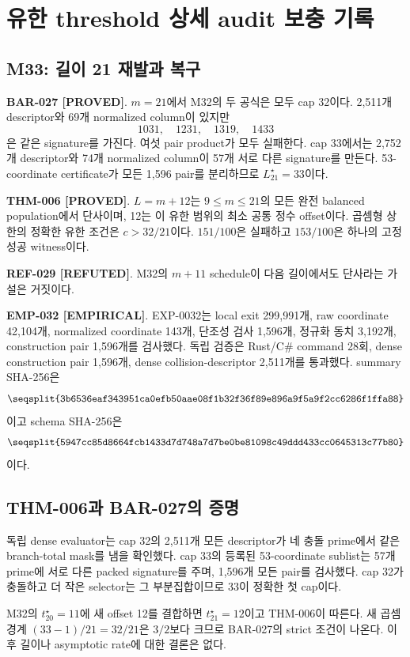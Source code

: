 \documentclass[11pt]{article}
\newcommand{\claimstatus}[2]{\textbf{#1 [#2]}}
\begin{document}
\section{유한 threshold 상세 audit 보충 기록}

\subsection{M33: 길이 21 재발과 복구}

\claimstatus{BAR-027}{PROVED}.
\(m=21\)에서 M32의 두 공식은 모두 cap 32이다. 2,511개 descriptor와
69개 normalized column이 있지만
\[
1031,\quad1231,\quad1319,\quad1433
\]
은 같은 signature를 가진다. 여섯 pair product가 모두 실패한다.
cap 33에서는 2,752개 descriptor와 74개 normalized column이 57개
서로 다른 signature를 만든다. 53-coordinate certificate가 모든
1,596 pair를 분리하므로 \(L_{21}^\star=33\)이다.

\claimstatus{THM-006}{PROVED}.
\(L=m+12\)는 \(9\le m\le21\)의 모든 완전 balanced population에서
단사이며, 12는 이 유한 범위의 최소 공통 정수 offset이다. 곱셈형
상한의 정확한 유한 조건은 \(c>32/21\)이다. \(151/100\)은 실패하고
\(153/100\)은 하나의 고정 성공 witness이다.

\claimstatus{REF-029}{REFUTED}.
M32의 \(m+11\) schedule이 다음 길이에서도 단사라는 가설은 거짓이다.

\claimstatus{EMP-032}{EMPIRICAL}.
EXP-0032는 local exit 299,991개, raw coordinate 42,104개,
normalized coordinate 143개, 단조성 검사 1,596개, 정규화 동치
3,192개, construction pair 1,596개를 검사했다. 독립 검증은
Rust/C\# command 28회, dense construction pair 1,596개, dense
collision-descriptor 2,511개를 통과했다. summary SHA-256은
\[
\texttt{\seqsplit{3b6536eaf343951ca0efb50aae08f1b32f36f89e896a9f5a9f2cc6286f1ffa88}}
\]
이고 schema SHA-256은
\[
\texttt{\seqsplit{5947cc85d8664fcb1433d7d748a7d7be0be81098c49ddd433cc0645313c77b80}}
\]
이다.

\subsection{THM-006과 BAR-027의 증명}

독립 dense evaluator는 cap 32의 2,511개 모든 descriptor가 네 충돌
prime에서 같은 branch-total mask를 냄을 확인했다. cap 33의 등록된
53-coordinate sublist는 57개 prime에 서로 다른 packed signature를
주며, 1,596개 모든 pair를 검사했다. cap 32가 충돌하고 더 작은
selector는 그 부분집합이므로 33이 정확한 첫 cap이다.

M32의 \(t_{20}^\star=11\)에 새 offset 12를 결합하면
\(t_{21}^\star=12\)이고 THM-006이 따른다. 새 곱셈 경계
\((33-1)/21=32/21\)은 \(3/2\)보다 크므로 BAR-027의 strict 조건이
나온다. 이후 길이나 asymptotic rate에 대한 결론은 없다.
\end{document}
